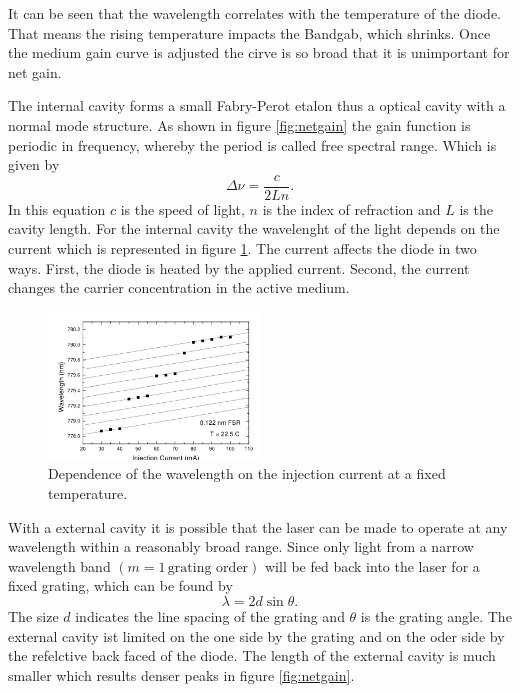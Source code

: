 It can be seen that the wavelength correlates with the temperature of the diode.
That means the rising temperature impacts the Bandgab, which shrinks.
Once the medium gain curve is adjusted the cirve is so broad that it is unimportant for net gain.

The internal cavity forms a small Fabry-Perot etalon thus a optical cavity with a normal mode structure. As shown in figure \ref{fig:netgain} the gain function
is periodic in frequency, whereby the period is called free spectral range. Which is given by
\begin{equation}
    \Delta \nu = \frac{c}{2Ln}.
\end{equation}
In this equation $c$ is the speed of light, $n$ is the index of refraction and $L$ is the cavity length.
For the internal cavity the wavelenght of the light depends on the current which is represented in figure \ref{fig:cur}.
The current affects the diode in two ways. First, the diode is heated by the applied current. Second, the current changes the carrier concentration
in the active medium.
\begin{figure}[H]
    \centering
    \includegraphics[width=0.5\textwidth]{content/graphics/current.jpg}
    \caption{Dependence of the wavelength on the injection current at a fixed temperature.} %
    \label{fig:cur}
\end{figure}

With a external cavity it is possible that the laser can be made to operate at any wavelength within a reasonably broad range.
Since only light from a narrow wavelength band $\left(m = 1  \,\text{grating order}\right)$ will be fed back into the laser for a fixed grating,
which can be found by 
\begin{equation}
    \lambda = 2 d \sin \theta.
\end{equation}
The size $d$ indicates the line spacing of the grating and $\theta$ is the grating angle. The external cavity ist limited on the one side by the grating and on the
oder side by the refelctive back faced  of the diode. The length of the external cavity is much smaller which results denser peaks in figure \ref{fig:netgain}.
